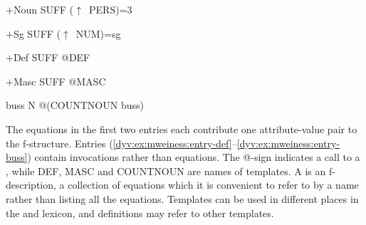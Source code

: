 \documentclass[output=paper]{langsci/langscibook}
\begin{document}
\ea\label{dyv:ex:mweiness:entry-noun}
{\sffamily 
$+$Noun \hspace{0.4em} SUFF \hspace{0.4em} ($\uparrow$~PERS)=3
}
\z

\ea\label{dyv:ex:mweiness:entry-sg}
{\sffamily 
$+$Sg \hspace{1.7em} SUFF \hspace{0.4em} ($\uparrow$~NUM)=sg
}
\z

\ea\label{dyv:ex:mweiness:entry-def}
{\sffamily 
$+$Def  \hspace{1.2em} SUFF \hspace{0.4em} @DEF
}
\z

\ea\label{dyv:ex:mweiness:entry-masc}
{\sffamily 
$+$Masc  \hspace{0.6em} SUFF \hspace{0.4em} @MASC
}
\z


\ea\label{dyv:ex:mweiness:entry-buss}
{\sffamily 
buss  \hspace{1.5em} N \hspace{1.8em} @(COUNTNOUN buss)
}
\z


The equations in the first two entries each contribute one attribute-value pair to the f-structure.
Entries (\ref{dyv:ex:mweiness:entry-def}--\ref{dyv:ex:mweiness:entry-buss}) contain  invocations rather than equations.
The \textsf{@}-sign indicates a call to a , while \textsf{DEF}, \textsf{MASC} and \textsf{COUNTNOUN} are names of templates.
A  is an f-description, a collection of equations which it is convenient to refer to by a name rather than listing all the equations.
Templates can be used in different places in the  and lexicon, and  definitions may refer to other templates.
\end{document}
